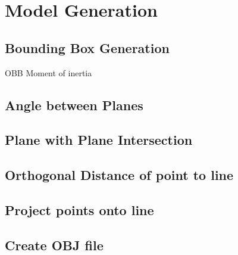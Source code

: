 \section{Model Generation}
		\subsection{Bounding Box Generation}
		OBB
		Moment of inertia
		
		\subsection{Angle between Planes}
		
		\subsection{Plane with Plane Intersection}
		
		\subsection{Orthogonal Distance of point to line}
		
		\subsection{Project points onto line}
		
		\subsection{Create OBJ file}

	


